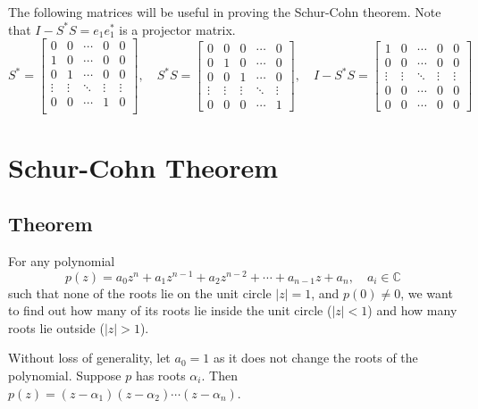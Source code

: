 \documentclass[twofold]{article}
\newcommand*\adj[1]{#1^*}
\theoremstyle{plain}
\theoremstyle{definition}
\theoremstyle{remark}
\begin{document}
The following matrices will be useful in proving the Schur-Cohn theorem. Note that \(I - \adj{S} S = e_1 \adj{e_1}\) is a projector matrix.
\[\adj{S} =  \begin{bmatrix} 
0 & 0 & \cdots & 0 & 0 \\
1 & 0 & \cdots & 0 & 0 \\
0 & 1 & \cdots & 0 & 0 \\
\vdots & \vdots & \ddots &\vdots & \vdots \\
0 & 0 & \cdots & 1 & 0 \\ 
\end{bmatrix}, \quad 
\adj{S} S  =  \begin{bmatrix} 
0 & 0 & 0 & \cdots & 0 \\
0 & 1 & 0 & \cdots & 0 \\
0 & 0 & 1 & \cdots & 0 \\
\vdots & \vdots & \vdots & \ddots & \vdots \\
0 & 0 & 0 & \cdots & 1
\end{bmatrix}, \quad 
 I - \adj{S} S =  \begin{bmatrix} 
1 & 0 & \cdots & 0 & 0 \\
0 & 0 & \cdots & 0 & 0 \\
\vdots & \vdots & \ddots &\vdots & \vdots \\
0 & 0 & \cdots & 0 & 0 \\ 
0 & 0 & \cdots & 0 & 0
\end{bmatrix}\]



\section{Schur-Cohn Theorem}

\subsection{Theorem}
For any polynomial \[p(z) = a_0 z^n + a_1z^{n-1} + a_2 z^{n-2} + \cdots +  a_{n-1} z + a_n, \quad a_i \in \mathbb{C}\]  such that none of the roots lie on the unit circle \(|z| = 1\),  and \(p(0) \ne 0\), we want to find out how many of its roots lie inside the unit circle (\(|z| < 1\))  and how many roots lie outside (\(|z| > 1\)).

 Without loss of generality, let \(a_0 = 1\) as it does not change the roots of the polynomial. Suppose \(p\) has roots \(\alpha_i\). Then \(p(z) = (z - \alpha_1) (z - \alpha_2) \cdots (z - \alpha_n)\). 
\end{document}
